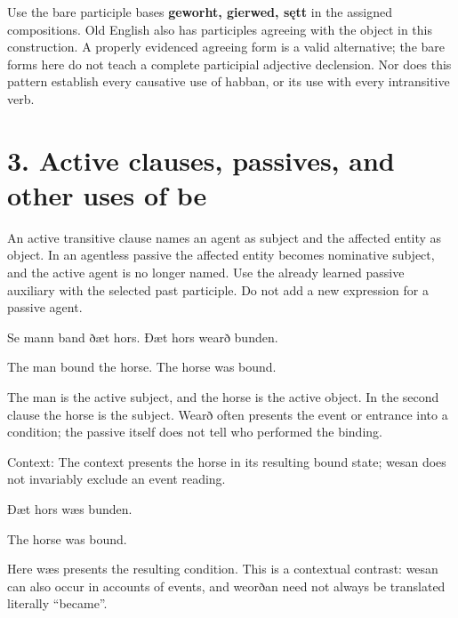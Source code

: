 Use the bare participle bases \textbf{geworht, gierwed, sętt} in the assigned compositions. Old English also has participles agreeing with the object in this construction. A properly evidenced agreeing form is a valid alternative; the bare forms here do not teach a complete participial adjective declension. Nor does this pattern establish every causative use of habban, or its use with every intransitive verb.

\section*{3. Active clauses, passives, and other uses of be}

An active transitive clause names an agent as subject and the affected entity as object. In an agentless passive the affected entity becomes nominative subject, and the active agent is no longer named. Use the already learned passive auxiliary with the selected past participle. Do not add a new expression for a passive agent.

Se mann band ðæt hors. Ðæt hors wearð bunden.

The man bound the horse. The horse was bound.

The man is the active subject, and the horse is the active object. In the second clause the horse is the subject. Wearð often presents the event or entrance into a condition; the passive itself does not tell who performed the binding.

Context: The context presents the horse in its resulting bound state; wesan does not invariably exclude an event reading.

Ðæt hors wæs bunden.

The horse was bound.

Here wæs presents the resulting condition. This is a contextual contrast: wesan can also occur in accounts of events, and weorðan need not always be translated literally “became”.


